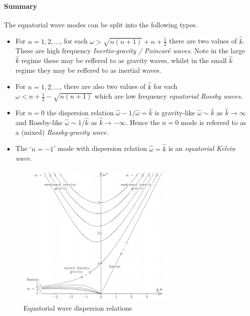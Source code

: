 \documentclass{jknotes}
\begin{document}
\paragraph{Summary}
The equatorial wave modes can be split into the following types.
\begin{itemize}
	\item For $n = 1, 2, \dots$, for each $\omega > \sqrt{n(n+1)} + n +
		\frac{1}{2}$ there are two values of $\hat{k}$. These are high
		frequency \emph{Inertio-gravity / Poincar\'{e} waves}. Note in the
		large $\hat{k}$ regime these may be reffered to as gravity waves,
		whilst in the small $\hat{k}$ regime they may be reffered to as
		inertial waves.
	\item For $n = 1, 2, \dots$, there are also two values of $\hat{k}$ for
		each $\omega < n + \frac{1}{2} - \sqrt{n(n+1)}$ which are low
		frequency \emph{equatorial Rossby waves}.
	\item For $n = 0$ the dispersion relation $\hat{\omega} - 1/\hat{\omega} =
		\hat{k}$ is gravity-like $\hat{\omega} \sim \hat{k}$ as
		$\hat{k} \to \infty$ and Rossby-like $\hat{\omega} \sim 1/\hat{k}$ as
		$\hat{k} \to -\infty$. Hence the $n=0$ mode is referred to as a
		(mixed) \emph{Rossby-gravity wave}.
	\item The `$n=-1$' mode with dispersion relation $\hat{\omega} = \hat{k}$ is
		an \emph{equatorial Kelvin wave}.
\end{itemize}

\begin{figure}
	\centering
	\includegraphics[width=0.7\textwidth]{equatorial.png}
	\caption{Equatorial wave dispersion relations}
\end{figure}
\end{document}
